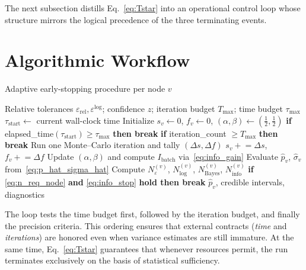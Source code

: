 The next subsection distills Eq.~\eqref{eq:Tstar} into an operational
control loop whose structure mirrors the logical precedence of the three
terminating events.

\section{Algorithmic Workflow}
\label{subsec:workflow}

\begin{algorithm}
  \caption{Adaptive early-stopping procedure per node $v$}
  \label{alg:convergence}
  \begin{algorithmic}[1]
    \Require Relative tolerances $\varepsilon_{\mathrm{rel}},\varepsilon^{\log}$;
            confidence $z$;
            iteration budget $T_{\max}$;
            time budget $\tau_{\max}$
    \State $\tau_{\mathrm{start}}\gets$ current wall-clock time
    \State Initialize $s_v\gets0$, $f_v\gets0$, $(\alpha,\beta)\gets(\tfrac12,\tfrac12)$
      \State \textbf{if} elapsed\_time$(\tau_{\mathrm{start}}) \ge \tau_{\max}$ \textbf{then break}
      \State \textbf{if} iteration\_count $\ge T_{\max}$ \textbf{then break}
      \State Run one Monte–Carlo iteration and tally $(\Delta s,\Delta f)$
      \State $s_v\mathrel{+}=\Delta s$, \quad $f_v\mathrel{+}=\Delta f$
      \State Update $(\alpha,\beta)$ and compute $I_{\text{batch}}$ via~\eqref{eq:info_gain}
      \State Evaluate $\widehat{p}_v$, $\widehat{\sigma}_v$ from~\eqref{eq:p_hat_sigma_hat}
      \State Compute $N_{\varepsilon}^{(v)}$, $N^{(v)}_{\log}$, $N_{\mathrm{Bayes}}^{(v)}$, $N_{\mathrm{info}}^{(v)}$
      \State \textbf{if} \eqref{eq:n_req_node} \textbf{and} \eqref{eq:info_stop} \textbf{hold then break}
    \EndWhile
    \State \Return $\widehat{p}_v$, credible intervals, diagnostics
  \end{algorithmic}
\end{algorithm}

The loop tests the time budget first, followed by the iteration budget, and
finally the precision criteria.  This ordering ensures that external contracts
(\emph{time} and \emph{iterations}) are honored even when variance estimates
are still immature.  At the same time, Eq.~\eqref{eq:Tstar} guarantees that
whenever resources permit, the run terminates exclusively on the basis of
statistical sufficiency.